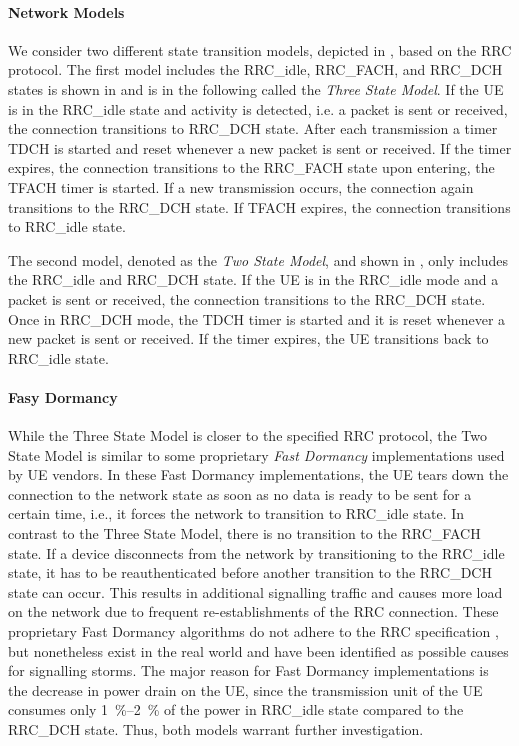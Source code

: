 \paragraph*{Network Models} We consider two different state transition models, depicted in , based on the \gls{RRC} protocol.
The first model includes the \gls{RRC_idle}, \gls{RRC_FACH}, and \gls{RRC_DCH} states is shown in  and is in the following called the \emph{Three State Model}.
If the \gls{UE} is in the \gls{RRC_idle} state and activity is detected, i.e. a packet is sent or received, the connection transitions to \gls{RRC_DCH} state.
After each transmission a timer \gls{TDCH} is started and reset whenever a new packet is sent or received.
If the timer expires, the connection transitions to the \gls{RRC_FACH} state upon entering, the \gls{TFACH} timer is started.
If a new transmission occurs, the connection again transitions to the \gls{RRC_DCH} state.
If \gls{TFACH} expires, the connection transitions to \gls{RRC_idle} state.

The second model, denoted as the \emph{Two State Model}, and shown in , only includes the \gls{RRC_idle} and \gls{RRC_DCH} state.
If the \gls{UE} is in the \gls{RRC_idle} mode and a packet is sent or received, the connection transitions to the \gls{RRC_DCH} state. Once in \gls{RRC_DCH} mode, the \gls{TDCH} timer is started and it is reset whenever a new packet is sent or received.
If the timer expires, the \gls{UE} transitions back to \gls{RRC_idle} state.

\paragraph*{Fasy Dormancy} While the Three State Model is closer to the specified \gls{RRC} protocol, the Two State Model is similar to some proprietary \emph{Fast Dormancy} implementations used by \gls{UE} vendors.
In these Fast Dormancy implementations, the \gls{UE} tears down the connection to the network state as soon as no data is ready to be sent for a certain time, i.e., it forces the network to transition to \gls{RRC_idle} state.
In contrast to the Three State Model, there is no transition to the \gls{RRC_FACH} state.
If a device disconnects from the network by transitioning to the \gls{RRC_idle} state, it has to be reauthenticated before another transition to the \gls{RRC_DCH} state can occur.
This results in additional signalling traffic and causes more load on the network \cite{NSN2011} due to frequent re-establishments of the RRC connection.
These proprietary Fast Dormancy algorithms do not adhere to the \gls{RRC} specification \cite{GSM2010}, but nonetheless exist in the real world and have been identified as possible causes for signalling storms.
The major reason for Fast Dormancy implementations is the decrease in power drain on the \gls{UE}, since the transmission unit of the \gls{UE} consumes only \SIrange{1}{2}{\percent} of the power in \gls{RRC_idle} state compared to the \gls{RRC_DCH} state.
Thus, both models warrant further investigation.


